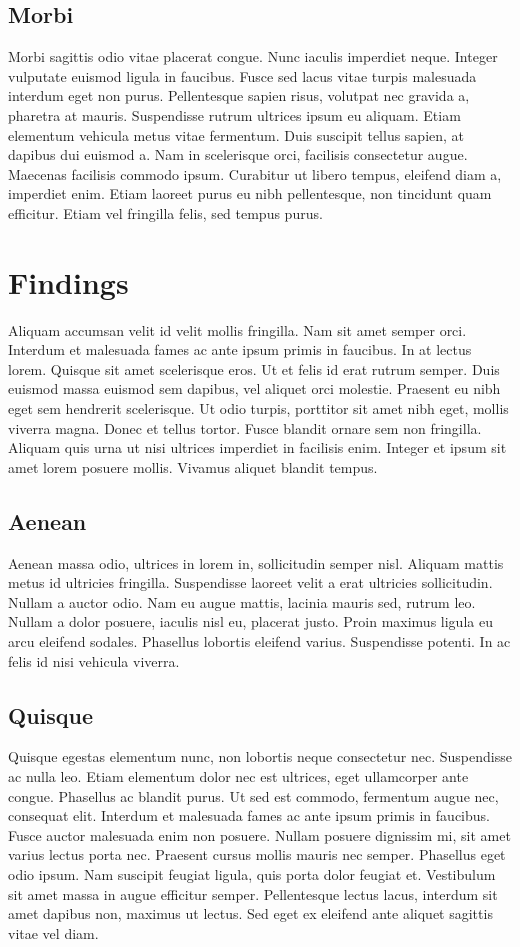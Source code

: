 \subsection{Morbi}
Morbi sagittis odio vitae placerat congue. Nunc iaculis imperdiet neque. Integer vulputate euismod ligula in faucibus. Fusce sed lacus vitae turpis malesuada interdum eget non purus. Pellentesque sapien risus, volutpat nec gravida a, pharetra at mauris. Suspendisse rutrum ultrices ipsum eu aliquam. Etiam elementum vehicula metus vitae fermentum. Duis suscipit tellus sapien, at dapibus dui euismod a. Nam in scelerisque orci, facilisis consectetur augue. Maecenas facilisis commodo ipsum. Curabitur ut libero tempus, eleifend diam a, imperdiet enim. Etiam laoreet purus eu nibh pellentesque, non tincidunt quam efficitur. Etiam vel fringilla felis, sed tempus purus. 


\section{Findings}\label{sec:findings}
Aliquam accumsan velit id velit mollis fringilla. Nam sit amet semper orci. Interdum et malesuada fames ac ante ipsum primis in faucibus. In at lectus lorem. Quisque sit amet scelerisque eros. Ut et felis id erat rutrum semper. Duis euismod massa euismod sem dapibus, vel aliquet orci molestie. Praesent eu nibh eget sem hendrerit scelerisque. Ut odio turpis, porttitor sit amet nibh eget, mollis viverra magna. Donec et tellus tortor. Fusce blandit ornare sem non fringilla. Aliquam quis urna ut nisi ultrices imperdiet in facilisis enim. Integer et ipsum sit amet lorem posuere mollis. Vivamus aliquet blandit tempus. 


\subsection{Aenean}
Aenean massa odio, ultrices in lorem in, sollicitudin semper nisl. Aliquam mattis metus id ultricies fringilla. Suspendisse laoreet velit a erat ultricies sollicitudin. Nullam a auctor odio. Nam eu augue mattis, lacinia mauris sed, rutrum leo. Nullam a dolor posuere, iaculis nisl eu, placerat justo. Proin maximus ligula eu arcu eleifend sodales. Phasellus lobortis eleifend varius. Suspendisse potenti. In ac felis id nisi vehicula viverra. 

\subsection{Quisque}
Quisque egestas elementum nunc, non lobortis neque consectetur nec. Suspendisse ac nulla leo. Etiam elementum dolor nec est ultrices, eget ullamcorper ante congue. Phasellus ac blandit purus. Ut sed est commodo, fermentum augue nec, consequat elit. Interdum et malesuada fames ac ante ipsum primis in faucibus. Fusce auctor malesuada enim non posuere. Nullam posuere dignissim mi, sit amet varius lectus porta nec. Praesent cursus mollis mauris nec semper. Phasellus eget odio ipsum. Nam suscipit feugiat ligula, quis porta dolor feugiat et. Vestibulum sit amet massa in augue efficitur semper. Pellentesque lectus lacus, interdum sit amet dapibus non, maximus ut lectus. Sed eget ex eleifend ante aliquet sagittis vitae vel diam. 

